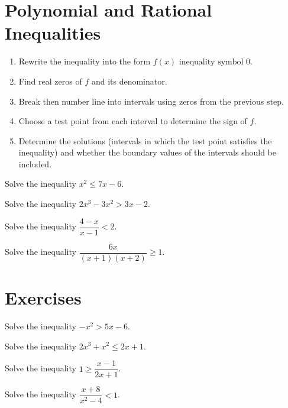 \newpage
\section{Polynomial and Rational Inequalities}
\begin{howto}
\begin{enumerate}
  \item Rewrite the inequality into the form $f(x)\text{~inequality symbol~} 0$.
  \item Find real zeros of $f$ and its denominator.
  \item Break then number line into intervals using zeros from the previous step.
  \item Choose a test point from each interval to determine the sign of $f$.
  \item Determine the solutions (intervals in which the test point satisfies the inequality) and whether the boundary values of the intervals should be included.
\end{enumerate}
\end{howto}

\begin{example}
  Solve the inequality $x^{2} \le 7 x - 6$.
\end{example}

\begin{example}
  Solve the inequality $2 x^{3} - 3 x^{2} >  3 x - 2$.
\end{example}

\newpage

\begin{example}
  Solve the inequality $\dfrac{4-x}{x - 1}< 2$.
\end{example}

\begin{example}
  Solve the inequality $\dfrac{6 x}{(x + 1) (x + 2)}\ge 1$.
\end{example}


\newpage
\section*{Exercises}

\begin{exercise}
  Solve the inequality $-x^2>5x-6$.
\end{exercise}

\begin{exercise}
  Solve the inequality $2 x^{3} + x^{2} \le 2 x + 1$.
\end{exercise}

\newpage

\begin{exercise}
  Solve the inequality $1\ge \dfrac{x-1}{2x+1}$.
\end{exercise}

\begin{exercise}
  Solve the inequality $\dfrac{x+8}{x^2-4}<1$.
\end{exercise}
